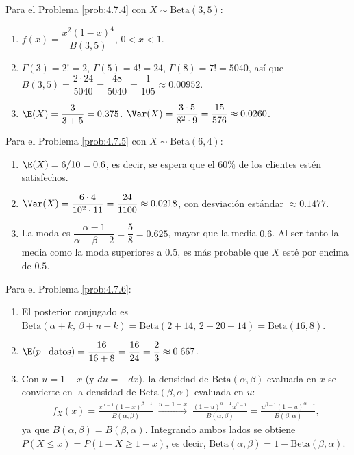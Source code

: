 \begin{solucion}
	\label{sol:4.7.4}
	Para el Problema \ref{prob:4.7.4} con $X \sim \text{Beta}(3,5)$:
	\begin{enumerate}
		\item $f(x) = \dfrac{x^{2}(1-x)^{4}}{B(3,5)}$, $0<x<1$.
		\item $\Gamma(3)=2!=2$, $\Gamma(5)=4!=24$, $\Gamma(8)=7!=5040$, así que $B(3,5) = \dfrac{2\cdot 24}{5040} = \dfrac{48}{5040} = \dfrac{1}{105} \approx 0.00952$.
		\item $\E(X) = \dfrac{3}{3+5} = 0.375$. $\Var(X) = \dfrac{3\cdot 5}{8^{2}\cdot 9} = \dfrac{15}{576} \approx 0.0260$. \quad \qedhere
	\end{enumerate}
\end{solucion}

\begin{solucion}
	\label{sol:4.7.5}
	Para el Problema \ref{prob:4.7.5} con $X \sim \text{Beta}(6,4)$:
	\begin{enumerate}
		\item $\E(X) = 6/10 = 0.6$, es decir, se espera que el $60\%$ de los clientes estén satisfechos.
		\item $\Var(X) = \dfrac{6\cdot 4}{10^{2}\cdot 11} = \dfrac{24}{1100} \approx 0.0218$, con desviación estándar $\approx 0.1477$.
		\item La moda es $\dfrac{\alpha-1}{\alpha+\beta-2} = \dfrac{5}{8} = 0.625$, mayor que la media $0.6$. Al ser tanto la media como la moda superiores a $0.5$, es más probable que $X$ esté por encima de $0.5$. \quad \qedhere
	\end{enumerate}
\end{solucion}

\begin{solucion}
	\label{sol:4.7.6}
	Para el Problema \ref{prob:4.7.6}:
	\begin{enumerate}
		\item El posterior conjugado es $\text{Beta}(\alpha+k,\,\beta+n-k) = \text{Beta}(2+14,\,2+20-14) = \text{Beta}(16,8)$.
		\item $\E(p\mid\text{datos}) = \dfrac{16}{16+8} = \dfrac{16}{24} = \dfrac{2}{3} \approx 0.667$.
		\item Con $u=1-x$ (y $du=-dx$), la densidad de $\text{Beta}(\alpha,\beta)$ evaluada en $x$ se convierte en la densidad de $\text{Beta}(\beta,\alpha)$ evaluada en $u$:
		\begin{align*}
			f_X(x) = \frac{x^{\alpha-1}(1-x)^{\beta-1}}{B(\alpha,\beta)} \; \xrightarrow{u=1-x} \; \frac{(1-u)^{\alpha-1}u^{\beta-1}}{B(\alpha,\beta)} = \frac{u^{\beta-1}(1-u)^{\alpha-1}}{B(\beta,\alpha)},
		\end{align*}
		ya que $B(\alpha,\beta)=B(\beta,\alpha)$. Integrando ambos lados se obtiene $P(X\le x) = P(1-X \ge 1-x)$, es decir, $\text{Beta}(\alpha,\beta) = 1-\text{Beta}(\beta,\alpha)$. \quad \qedhere
	\end{enumerate}
\end{solucion}


